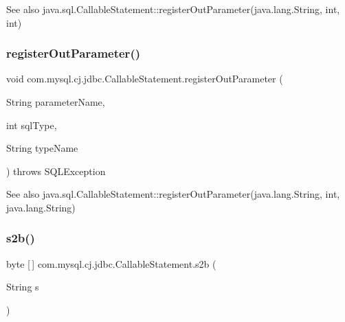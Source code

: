 \begin{DoxySeeAlso}{See also}
java.\+sql.\+Callable\+Statement\+::register\+Out\+Parameter(java.\+lang.\+String, int, int) 
\end{DoxySeeAlso}
\mbox{\label{classcom_1_1mysql_1_1cj_1_1jdbc_1_1_callable_statement_a5c95bebcfabf37c4d4cf1f054e5b2278}} 
\subsubsection{\texorpdfstring{register\+Out\+Parameter()}{registerOutParameter()}\hspace{0.1cm}{\footnotesize\ttfamily [3/3]}}
{\footnotesize\ttfamily void com.\+mysql.\+cj.\+jdbc.\+Callable\+Statement.\+register\+Out\+Parameter (\begin{DoxyParamCaption}\item[{String}]{parameter\+Name,  }\item[{int}]{sql\+Type,  }\item[{String}]{type\+Name }\end{DoxyParamCaption}) throws S\+Q\+L\+Exception}

\begin{DoxySeeAlso}{See also}
java.\+sql.\+Callable\+Statement\+::register\+Out\+Parameter(java.\+lang.\+String, int, java.\+lang.\+String) 
\end{DoxySeeAlso}
\mbox{\label{classcom_1_1mysql_1_1cj_1_1jdbc_1_1_callable_statement_a7d985ddf5b86f79d5133d106d26dce95}} 
\subsubsection{\texorpdfstring{s2b()}{s2b()}}
{\footnotesize\ttfamily byte \mbox{[}$\,$\mbox{]} com.\+mysql.\+cj.\+jdbc.\+Callable\+Statement.\+s2b (\begin{DoxyParamCaption}\item[{String}]{s }\end{DoxyParamCaption})\hspace{0.3cm}{\ttfamily [protected]}}

